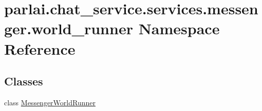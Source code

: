 \hypertarget{namespaceparlai_1_1chat__service_1_1services_1_1messenger_1_1world__runner}{}\section{parlai.\+chat\+\_\+service.\+services.\+messenger.\+world\+\_\+runner Namespace Reference}
\label{namespaceparlai_1_1chat__service_1_1services_1_1messenger_1_1world__runner}
\subsection*{Classes}
\begin{DoxyCompactItemize}
\item 
class \hyperlink{classparlai_1_1chat__service_1_1services_1_1messenger_1_1world__runner_1_1MessengerWorldRunner}{Messenger\+World\+Runner}
\end{DoxyCompactItemize}
